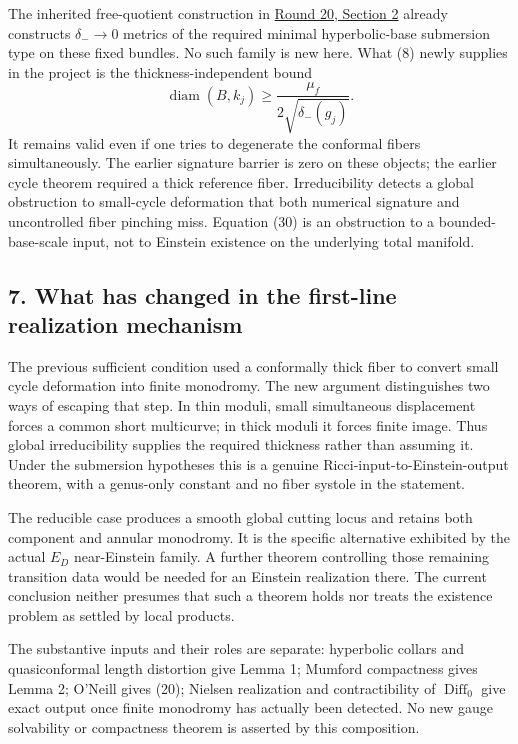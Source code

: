 \documentclass[
  11pt,
]{article}
\begin{document}
The inherited free-quotient construction in
\href{../mathematics/current/round20_construction.md}{Round 20, Section
2} already constructs \(\delta_-\to0\) metrics of the required minimal
hyperbolic-base submersion type on these fixed bundles. No such family
is new here. What (8) newly supplies in the project is the
thickness-independent bound \[
             \operatorname{diam}(B,k_j)
                         \ge\frac{\mu_f}{2\sqrt{\delta_-(g_j)}}.
\tag{30}
\] It remains valid even if one tries to degenerate the conformal fibers
simultaneously. The earlier signature barrier is zero on these objects;
the earlier cycle theorem required a thick reference fiber.
Irreducibility detects a global obstruction to small-cycle deformation
that both numerical signature and uncontrolled fiber pinching miss.
Equation (30) is an obstruction to a bounded-base-scale input, not to
Einstein existence on the underlying total manifold.

\hypertarget{what-has-changed-in-the-first-line-realization-mechanism}{%
\subsection{7. What has changed in the first-line realization
mechanism}\label{what-has-changed-in-the-first-line-realization-mechanism}}

The previous sufficient condition used a conformally thick fiber to
convert small cycle deformation into finite monodromy. The new argument
distinguishes two ways of escaping that step. In thin moduli, small
simultaneous displacement forces a common short multicurve; in thick
moduli it forces finite image. Thus global irreducibility supplies the
required thickness rather than assuming it. Under the submersion
hypotheses this is a genuine Ricci-input-to-Einstein-output theorem,
with a genus-only constant and no fiber systole in the statement.

The reducible case produces a smooth global cutting locus and retains
both component and annular monodromy. It is the specific alternative
exhibited by the actual \(E_D\) near-Einstein family. A further theorem
controlling those remaining transition data would be needed for an
Einstein realization there. The current conclusion neither presumes that
such a theorem holds nor treats the existence problem as settled by
local products.

The substantive inputs and their roles are separate: hyperbolic collars
and quasiconformal length distortion give Lemma 1; Mumford compactness
gives Lemma 2; O'Neill gives (20); Nielsen realization and
contractibility of \(\operatorname{Diff}_0\) give exact output once
finite monodromy has actually been detected. No new gauge solvability or
compactness theorem is asserted by this composition.
\end{document}

